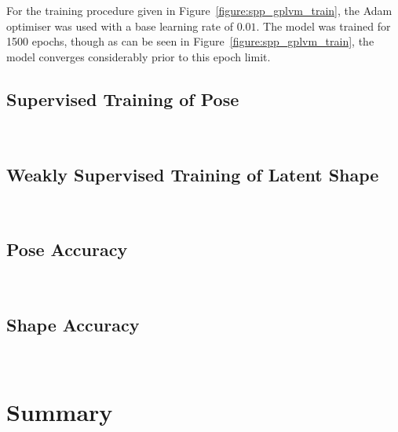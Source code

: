For the training procedure given in Figure~\ref{figure:spp_gplvm_train}, the Adam~\cite{Kingma2014} 
optimiser was used with a base learning rate of \( 0.01 \). The model was trained for 1500 epochs, 
though as can be seen in Figure~\ref{figure:spp_gplvm_train}, the model converges considerably 
prior to this epoch limit.

\subsection{Supervised Training of Pose}
~\label{sec:spp_quantitative_pose_train}

\subsection{Weakly Supervised Training of Latent Shape}
~\label{sec:spp_quantitative_latentshape_train}

\subsection{Pose Accuracy}
~\label{sec:spp_quantitative_pose_accuracy}

\subsection{Shape Accuracy}
~\label{sec:spp_quantitative_pose_accuracy}

\section{Summary}
~\label{sec:spp_discussion}
